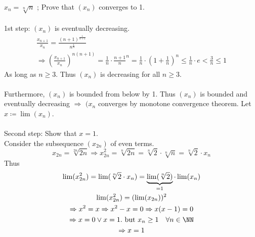 \documentclass[class=scrartcl, crop=false]{standalone}
\begin{document}
\begin{example}
  $x_n = \sqrt[n]{n}$ ; Prove that $(x_n)$ converges to 1.
  \\\\
  1st step: $(x_n)$ is eventually decreasing.
  \begin{gather*}
    \frac{x_{n + 1}}{x_n} = \frac{(n + 1)^{\frac{1}{n + 1}}}{n^{\frac{1}{n}}} \\
    \Rightarrow (\frac{x_{n + 1}}{x_n})^{n(n + 1)} = \frac{1}{n} \cdot \frac{n + 1}{n}^n 
    = \frac{1}{n} \cdot (1 + \frac{1}{n})^n \leq \frac{1}{n} \cdot e < \frac{3}{n} \leq 1
  \end{gather*}
  As long as $n \geq 3$. Thus $(x_n)$ is decreasing for all $n \geq 3$. 
  \\\\
  Furthermore, $(x_n)$ is bounded from below by 1. Thus $(x_n)$ is bounded and eventually decreasing $\Rightarrow$ $(x_n$ converges by monotone convergence theorem. Let $x \coloneqq \lim(x_n)$. 
  \\\\
  Second step: Show that $x = 1$.
  \\
  Consider the subsequence $(x_{2n})$ of even terms. 
  \[
    x_{2n} = \sqrt[2n]{2n} \Rightarrow x_{2n}^2 = \sqrt[n]{2n} = \sqrt[n]{2} \cdot \sqrt[n]{n} = \sqrt[n]{2} \cdot x_n
  \]
  Thus 
  \begin{gather*}
    \lim(x_{2n}^2) = \lim(\sqrt[n]{2} \cdot x_n) = \underbrace{\lim(\sqrt[n]{2})}_{=1} \cdot \lim(x_n) \\
    \lim(x_{2n}^2) = (\lim(x_{2n}))^2 \\
    \Rightarrow x^2 = x \Rightarrow x^2 - x = 0 \Rightarrow x(x - 1) = 0 \\
    \Rightarrow x = 0 \vee x = 1. \ \text{but} \ x_n \geq 1 \quad \forall n \in \NN \\
    \Rightarrow x = 1
  \end{gather*}
\end{example}
\end{document}
